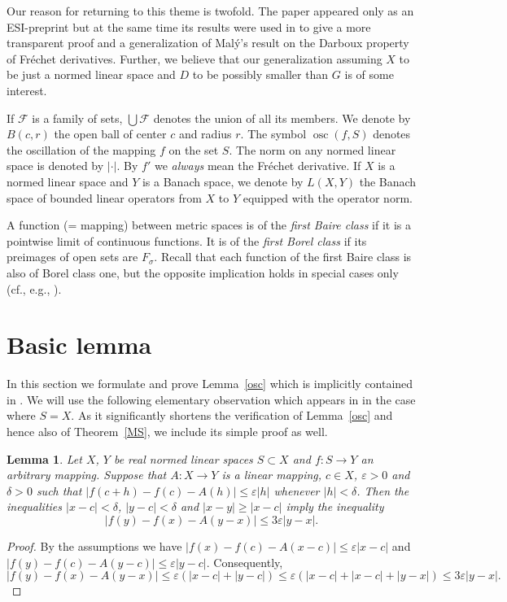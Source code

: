 \documentclass[12pt,a4paper]{amsart}
\theoremstyle{plain}
\newtheorem{lemma}[theorem]{Lemma}         %
\theoremstyle{definition}
\theoremstyle{remark}
\numberwithin{equation}{section}
\newcommand{\osc}{\operatorname{osc}}
\newcommand{\ep}{\varepsilon}
\newcommand{\F}{{\mathcal{F}}}
\begin{document}
 Our reason for returning    to this theme is twofold. The paper \cite{MS} appeared only as an ESI-preprint but at the same time its results were used in \cite{HWZ} to give a more transparent proof and a  generalization of
Malý's result on the Darboux property of  Fréchet derivatives. Further, we believe that our generalization
assuming $X$ to be just a  normed linear space and $D$ to be possibly smaller than $G$ is of some interest.
\vspace{2mm}
 
If $\F$ is a family of sets, $\bigcup \F$ denotes the union of all its members.
We denote by $B(c,r)$ the open ball of center $c$ and radius $r$. The symbol $\osc(f,S)$ denotes the oscillation of the mapping $f$ on the set $S$.  The norm on any normed linear space is denoted by $|\cdot|$. 
By $f'$ we {\em always} mean the Fréchet derivative.
  If  $X$ is a  normed linear space  and $Y$  is a Banach space,  we denote by $L(X,Y)$   the Banach space of bounded linear operators from $X$ to $Y$ equipped with the operator  norm.    

A function (= mapping) between metric spaces is of the {\it first Baire class} if it is a pointwise limit of 
 continuous functions. It is of the {\it  first Borel class} if its preimages of open sets are $F_{\sigma}$.
Recall that each function of the first Baire class is also of  Borel class one, but the opposite implication
 holds in special cases only (cf., e.g., \cite{V}). 





\section{Basic lemma}

 In this section we formulate and  prove   Lemma~\ref{osc} which is implicitly contained in \cite{MS}.
We  will use the following  elementary observation which appears in  \cite{Z87} in the case where $S=X$. As it significantly shortens the verification of Lemma~\ref{osc} and hence also of Theorem~\ref{MS}, we include its simple proof as well.

\begin{lemma}\label{zah} 
Let $X$, $Y$ be real normed linear spaces  $S\subset X$ and $f:S \to Y$ an arbitrary mapping. Suppose that
 $A:X \to Y$ is a linear mapping, $c\in X$, $\ep>0$ and $\delta>0$ such that
 $|f(c+h)-f(c)- A(h)| \leq \ep |h|$ whenever $|h|< \delta$. Then the inequalities $|x-c|< \delta$,
 $|y-c|< \delta$ and $|x-y|\geq |x-c|$ imply the inequality
$$   |f(y)-f(x)- A(y- x)| \leq 3\ep |y-x|. $$
\end{lemma}
\begin{proof}
By the assumptions we have $|f(x)- f(c)- A(x-c)| \leq \ep|x-c|$ and
$|f(y)-f(c)-A(y-c)|\leq \ep |y - c|$. Consequently,
$$
|f(y)-f(x)-A(y-x)|\leq\ep(|x-c| + |y-c|)\leq \ep(|x-c| + |x-c| +
|y-x|)\leq 3\ep|y-x|.
$$
\end{proof}
\end{document}
